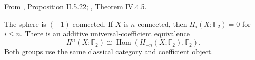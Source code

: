 \begin{theorem}
\label{sem:Literature:connected-homology}
From \cite{SchwedeSymmetricSpectra}, Proposition II.5.22; \cite{EKMM}, Theorem IV.4.5.\par

The sphere is $(-1)$-connected. If $X$ is $n$-connected, then $H_i(X;\mathbb F_2)=0$ for $i\le n$. There is an additive universal-coefficient equivalence
\[H^n(X;\mathbb F_2)\cong\operatorname{Hom}(H_{-n}(X;\mathbb F_2),\mathbb F_2).\]
Both groups use the same classical category and coefficient object.
\end{theorem}

